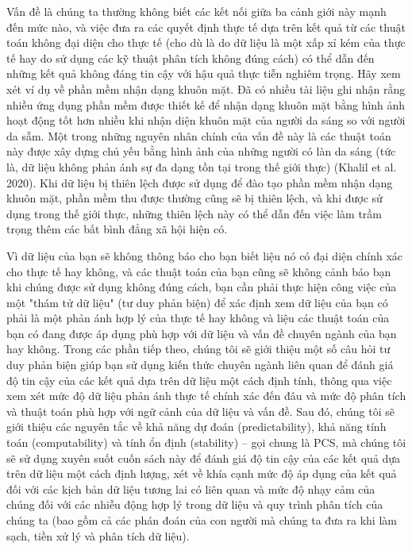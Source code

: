 Vấn đề là chúng ta thường không biết các kết nối giữa ba cảnh giới này mạnh đến mức nào, và việc đưa ra các quyết định thực tế dựa trên kết quả từ các thuật toán không đại diện cho thực tế (cho dù là do dữ liệu là một xấp xỉ kém của thực tế hay do sử dụng các kỹ thuật phân tích không đúng cách) có thể dẫn đến những kết quả không đáng tin cậy với hậu quả thực tiễn nghiêm trọng. Hãy xem xét ví dụ về phần mềm nhận dạng khuôn mặt. Đã có nhiều tài liệu ghi nhận rằng nhiều ứng dụng phần mềm được thiết kế để nhận dạng khuôn mặt bằng hình ảnh hoạt động tốt hơn nhiều khi nhận diện khuôn mặt của người da sáng so với người da sẫm. Một trong những nguyên nhân chính của vấn đề này là các thuật toán này được xây dựng chủ yếu bằng hình ảnh của những người có làn da sáng (tức là, dữ liệu không phản ánh sự đa dạng tồn tại trong thế giới thực) (Khalil et al. 2020). Khi dữ liệu bị thiên lệch được sử dụng để đào tạo phần mềm nhận dạng khuôn mặt, phần mềm thu được thường cũng sẽ bị thiên lệch, và khi được sử dụng trong thế giới thực, những thiên lệch này có thể dẫn đến việc làm trầm trọng thêm các bất bình đẳng xã hội hiện có.

Vì dữ liệu của bạn sẽ không thông báo cho bạn biết liệu nó có đại diện chính xác cho thực tế hay không, và các thuật toán của bạn cũng sẽ không cảnh báo bạn khi chúng được sử dụng không đúng cách, bạn cần phải thực hiện công việc của một "thám tử dữ liệu" (tư duy phản biện) để xác định xem dữ liệu của bạn có phải là một phản ánh hợp lý của thực tế hay không và liệu các thuật toán của bạn có đang được áp dụng phù hợp với dữ liệu và vấn đề chuyên ngành của bạn hay không. Trong các phần tiếp theo, chúng tôi sẽ giới thiệu một số câu hỏi tư duy phản biện giúp bạn sử dụng kiến thức chuyên ngành liên quan để đánh giá độ tin cậy của các kết quả dựa trên dữ liệu một cách định tính, thông qua việc xem xét mức độ dữ liệu phản ánh thực tế chính xác đến đâu và mức độ phân tích và thuật toán phù hợp với ngữ cảnh của dữ liệu và vấn đề. Sau đó, chúng tôi sẽ giới thiệu các nguyên tắc về khả năng dự đoán (predictability), khả năng tính toán (computability) và tính ổn định (stability) – gọi chung là PCS, mà chúng tôi sẽ sử dụng xuyên suốt cuốn sách này để đánh giá độ tin cậy của các kết quả dựa trên dữ liệu một cách định lượng, xét về khía cạnh mức độ áp dụng của kết quả đối với các kịch bản dữ liệu tương lai có liên quan và mức độ nhạy cảm của chúng đối với các nhiễu động hợp lý trong dữ liệu và quy trình phân tích của chúng ta (bao gồm cả các phán đoán của con người mà chúng ta đưa ra khi làm sạch, tiền xử lý và phân tích dữ liệu).

